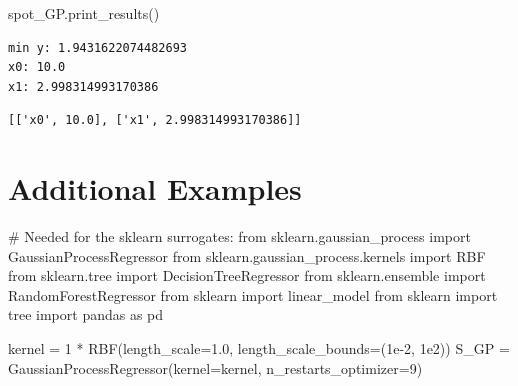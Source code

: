 \documentclass[
  letterpaper,
  DIV=11,
  numbers=noendperiod]{scrreprt}
\newenvironment{Shaded}{\begin{snugshade}}{\end{snugshade}}
\newcommand{\CommentTok}[1]{\textcolor[rgb]{0.37,0.37,0.37}{#1}}
\newcommand{\DecValTok}[1]{\textcolor[rgb]{0.68,0.00,0.00}{#1}}
\newcommand{\FloatTok}[1]{\textcolor[rgb]{0.68,0.00,0.00}{#1}}
\newcommand{\ImportTok}[1]{\textcolor[rgb]{0.00,0.46,0.62}{#1}}
\newcommand{\NormalTok}[1]{\textcolor[rgb]{0.00,0.23,0.31}{#1}}
\newcommand{\OperatorTok}[1]{\textcolor[rgb]{0.37,0.37,0.37}{#1}}
\begin{document}
\begin{Shaded}
\begin{Highlighting}[]
\NormalTok{spot\_GP.print\_results()}
\end{Highlighting}
\end{Shaded}

\begin{verbatim}
min y: 1.9431622074482693
x0: 10.0
x1: 2.998314993170386
\end{verbatim}

\begin{verbatim}
[['x0', 10.0], ['x1', 2.998314993170386]]
\end{verbatim}

\hypertarget{additional-examples}{%
\section{Additional Examples}\label{additional-examples}}

\begin{Shaded}
\begin{Highlighting}[]
\CommentTok{\# Needed for the sklearn surrogates:}
\ImportTok{from}\NormalTok{ sklearn.gaussian\_process }\ImportTok{import}\NormalTok{ GaussianProcessRegressor}
\ImportTok{from}\NormalTok{ sklearn.gaussian\_process.kernels }\ImportTok{import}\NormalTok{ RBF}
\ImportTok{from}\NormalTok{ sklearn.tree }\ImportTok{import}\NormalTok{ DecisionTreeRegressor}
\ImportTok{from}\NormalTok{ sklearn.ensemble }\ImportTok{import}\NormalTok{ RandomForestRegressor}
\ImportTok{from}\NormalTok{ sklearn }\ImportTok{import}\NormalTok{ linear\_model}
\ImportTok{from}\NormalTok{ sklearn }\ImportTok{import}\NormalTok{ tree}
\ImportTok{import}\NormalTok{ pandas }\ImportTok{as}\NormalTok{ pd}
\end{Highlighting}
\end{Shaded}

\begin{Shaded}
\begin{Highlighting}[]
\NormalTok{kernel }\OperatorTok{=} \DecValTok{1} \OperatorTok{*}\NormalTok{ RBF(length\_scale}\OperatorTok{=}\FloatTok{1.0}\NormalTok{, length\_scale\_bounds}\OperatorTok{=}\NormalTok{(}\FloatTok{1e{-}2}\NormalTok{, }\FloatTok{1e2}\NormalTok{))}
\NormalTok{S\_GP }\OperatorTok{=}\NormalTok{ GaussianProcessRegressor(kernel}\OperatorTok{=}\NormalTok{kernel, n\_restarts\_optimizer}\OperatorTok{=}\DecValTok{9}\NormalTok{)}
\end{Highlighting}
\end{Shaded}
\end{document}
